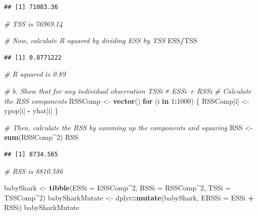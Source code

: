 \documentclass[]{article}
\newenvironment{Shaded}{\begin{snugshade}}{\end{snugshade}}
\newcommand{\KeywordTok}[1]{\textcolor[rgb]{0.13,0.29,0.53}{\textbf{#1}}}
\newcommand{\DataTypeTok}[1]{\textcolor[rgb]{0.13,0.29,0.53}{#1}}
\newcommand{\DecValTok}[1]{\textcolor[rgb]{0.00,0.00,0.81}{#1}}
\newcommand{\StringTok}[1]{\textcolor[rgb]{0.31,0.60,0.02}{#1}}
\newcommand{\CommentTok}[1]{\textcolor[rgb]{0.56,0.35,0.01}{\textit{#1}}}
\newcommand{\ControlFlowTok}[1]{\textcolor[rgb]{0.13,0.29,0.53}{\textbf{#1}}}
\newcommand{\OperatorTok}[1]{\textcolor[rgb]{0.81,0.36,0.00}{\textbf{#1}}}
\newcommand{\NormalTok}[1]{#1}
\begin{document}
\begin{verbatim}
## [1] 71083.36
\end{verbatim}

\begin{Shaded}
\begin{Highlighting}[]
\CommentTok{# TSS is 76969.14}

\CommentTok{# Now, calculate R squared by dividing ESS by TSS }
\NormalTok{ESS}\OperatorTok{/}\NormalTok{TSS}
\end{Highlighting}
\end{Shaded}

\begin{verbatim}
## [1] 0.8771222
\end{verbatim}

\begin{Shaded}
\begin{Highlighting}[]
\CommentTok{# R squared is 0.89 }

\CommentTok{# b. Show that for any individual observation TSSi ≠ ESSi + RSSi }
\CommentTok{# Calculate the RSS components }
\NormalTok{RSSComp <-}\StringTok{ }\KeywordTok{vector}\NormalTok{()}
\ControlFlowTok{for}\NormalTok{ (i }\ControlFlowTok{in} \DecValTok{1}\OperatorTok{:}\DecValTok{1000}\NormalTok{) \{}
\NormalTok{  RSSComp[i] <-}\StringTok{ }\NormalTok{ypop[i] }\OperatorTok{-}\StringTok{ }\NormalTok{yhat[i]}
\NormalTok{\}}

\CommentTok{# Then, calculate the RSS by summing up the components and squaring }
\NormalTok{RSS <-}\StringTok{ }\KeywordTok{sum}\NormalTok{(RSSComp}\OperatorTok{^}\DecValTok{2}\NormalTok{)}
\NormalTok{RSS}
\end{Highlighting}
\end{Shaded}

\begin{verbatim}
## [1] 8734.565
\end{verbatim}

\begin{Shaded}
\begin{Highlighting}[]
\CommentTok{# RSS is 8810.586}

\NormalTok{babyShark <-}\StringTok{ }\KeywordTok{tibble}\NormalTok{(}\DataTypeTok{ESSi =}\NormalTok{ ESSComp}\OperatorTok{^}\DecValTok{2}\NormalTok{, }\DataTypeTok{RSSi =}\NormalTok{ RSSComp}\OperatorTok{^}\DecValTok{2}\NormalTok{, }\DataTypeTok{TSSi =}\NormalTok{ TSSComp}\OperatorTok{^}\DecValTok{2}\NormalTok{)}
\NormalTok{babySharkMutate <-}\StringTok{ }\NormalTok{dplyr}\OperatorTok{::}\KeywordTok{mutate}\NormalTok{(babyShark, }\DataTypeTok{ERSSi =}\NormalTok{ ESSi }\OperatorTok{+}\StringTok{ }\NormalTok{RSSi)}
\NormalTok{babySharkMutate}
\end{Highlighting}
\end{Shaded}
\end{document}
